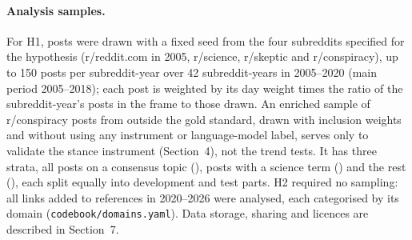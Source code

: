 \documentclass[10pt,a4paper]{article}
\newcommand{\kod}[1]{\texttt{#1}}
\begin{document}
\paragraph{Analysis samples.}
For H1, \resHoneSample{} posts were drawn with a fixed seed from the four subreddits
specified for the hypothesis (r/reddit.com in 2005, r/science, r/skeptic and
r/conspiracy), up to 150 posts per subreddit-year over 42 subreddit-years in 2005--2020
(main period 2005--2018); each post is weighted by its day weight times the ratio of the
subreddit-year's posts in the frame to those drawn. An enriched sample of
\resEnrichedPosts{} r/conspiracy posts from outside the gold standard, drawn with inclusion
weights and without using any instrument or language-model label, serves only to validate
the stance instrument (Section~4), not the trend tests.
It has three strata, all posts on a consensus topic (\resEnrichedTopic), posts with a
science term (\resEnrichedScience) and the rest (\resEnrichedRest), each split equally
into development and test parts.
H2 required no sampling: all \resHtwoLinks{} links added to references in 2020--2026 were
analysed, each categorised by its domain (\kod{codebook/domains.yaml}). Data storage,
sharing and licences are described in Section~7.
\end{document}
